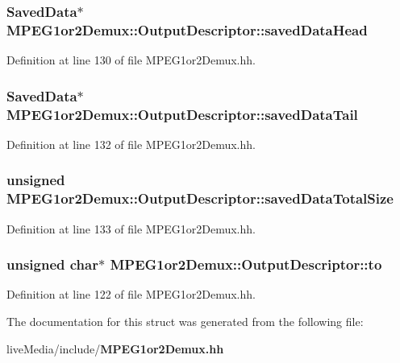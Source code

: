 \subsubsection[{saved\+Data\+Head}]{\setlength{\rightskip}{0pt plus 5cm}Saved\+Data$\ast$ M\+P\+E\+G1or2\+Demux\+::\+Output\+Descriptor\+::saved\+Data\+Head}\label{structMPEG1or2Demux_1_1OutputDescriptor_a41f6c0308c3dd95d37bbf6029d19903c}


Definition at line 130 of file M\+P\+E\+G1or2\+Demux.\+hh.

\subsubsection[{saved\+Data\+Tail}]{\setlength{\rightskip}{0pt plus 5cm}Saved\+Data$\ast$ M\+P\+E\+G1or2\+Demux\+::\+Output\+Descriptor\+::saved\+Data\+Tail}\label{structMPEG1or2Demux_1_1OutputDescriptor_a940ceab8bfc72a259a5346d2542abc22}


Definition at line 132 of file M\+P\+E\+G1or2\+Demux.\+hh.

\subsubsection[{saved\+Data\+Total\+Size}]{\setlength{\rightskip}{0pt plus 5cm}unsigned M\+P\+E\+G1or2\+Demux\+::\+Output\+Descriptor\+::saved\+Data\+Total\+Size}\label{structMPEG1or2Demux_1_1OutputDescriptor_a880a45349c51c2689bdd196388331f26}


Definition at line 133 of file M\+P\+E\+G1or2\+Demux.\+hh.

\subsubsection[{to}]{\setlength{\rightskip}{0pt plus 5cm}unsigned char$\ast$ M\+P\+E\+G1or2\+Demux\+::\+Output\+Descriptor\+::to}\label{structMPEG1or2Demux_1_1OutputDescriptor_a755e90f24ba721be53fdc30f4b9caadb}


Definition at line 122 of file M\+P\+E\+G1or2\+Demux.\+hh.



The documentation for this struct was generated from the following file\+:\begin{DoxyCompactItemize}
\item 
live\+Media/include/{\bf M\+P\+E\+G1or2\+Demux.\+hh}\end{DoxyCompactItemize}
